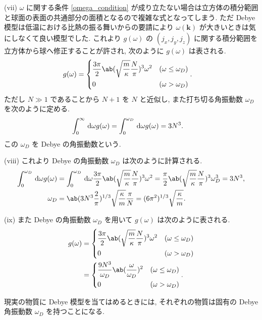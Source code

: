 \documentclass[uplatex,dvipdfmx,a4paper,11pt]{jlreq}
\numberwithin{equation}{section}
\theoremstyle{definition}
\begin{document}
(vii) $\omega$ に関する条件 \eqref{omega_condition} が成り立たない場合は立方体の積分範囲と球面の表面の共通部分の面積となるので複雑な式となってしまう. ただ Debye 模型は低温における比熱の振る舞いからの要請により $\omega(\bm{k})$ が大きいときは気にしなくて良い模型でした.
これより $g(\omega)$ の $(j_x, j_y, j_z)$ に関する積分範囲を立方体から球へ修正することが許され, 次のように $g(\omega)$ は表される.
\begin{align}
  g(\omega) & = \begin{dcases}
                  \frac{3\pi}{2}\ab(\sqrt{\frac{m}{\kappa}}\frac{N}{\pi})^3\omega^2 & (\omega\leq\omega_D) \\
                  0                                                                 & (\omega > \omega_D)
                \end{dcases}.
\end{align}
ただし $N\gg 1$ であることから $N+1$ を $N$ と近似し, また打ち切る角振動数 $\omega_D$ を次のように定める.
\begin{align}
  \int_0^\infty\dl{\omega}g(\omega) & = \int_0^{\omega_D}\dl{\omega}g(\omega) = 3N^3.
\end{align}
この $\omega_D$ を Debye の角振動数という.

(viii) これより Debye の角振動数 $\omega_D$ は次のように計算される.
\begin{align}
  \int_0^{\omega_D}\dl{\omega}g(\omega) & = \int_0^{\omega_D}\dl{\omega}\frac{3\pi}{2}\ab(\sqrt{\frac{m}{\kappa}}\frac{N}{\pi})^3\omega^2 = \frac{\pi}{2}\ab(\sqrt{\frac{m}{\kappa}}\frac{N}{\pi})^3\omega_D^3 = 3N^3, \\
  \omega_D                              & = \ab(3N^3\frac{2}{\pi})^{1/3}\sqrt{\frac{\kappa}{m}}\frac{\pi}{N} = (6\pi^2)^{1/3}\sqrt{\frac{\kappa}{m}}.
\end{align}

(ix) また Debye の角振動数 $\omega_D$ を用いて $g(\omega)$ は次のように表される.
\begin{align}
  g(\omega) & = \begin{dcases}
                  \frac{3\pi}{2}\ab(\sqrt{\frac{m}{\kappa}}\frac{N}{\pi})^3\omega^2 & (\omega\leq\omega_D) \\
                  0                                                                 & (\omega > \omega_D)
                \end{dcases} \\
            & = \begin{dcases}
                  \frac{9N^3}{\omega_D}\ab(\frac{\omega}{\omega_D})^2 & (\omega\leq\omega_D) \\
                  0                                                   & (\omega > \omega_D)
                \end{dcases}.
\end{align}

現実の物質に Debye 模型を当てはめるときには, それぞれの物質は固有の Debye 角振動数 $\omega_D$ を持つことになる.
\end{document}

